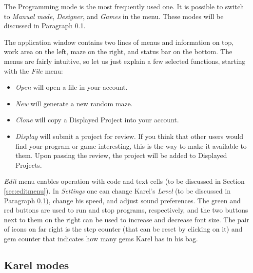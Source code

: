 \noindent
The Programming mode is the most frequently used one. It is possible to 
switch to {\em Manual mode}, {\em Designer}, and {\em Games} in the menu. 
These modes will be discussed in Paragraph \ref{levels}.

The application window contains two lines of menus and information on top,
work area on the left, maze on the right, and status bar on the bottom.
The menus are fairly intuitive, so let us just explain a few selected 
functions, starting with the {\em File} menu:

\begin{itemize}
\item {\em Open} will open a file in your account.
\item {\em New} will generate a new random maze.
\item {\em Clone} will copy a Displayed Project into your account. 
\item {\em Display} will submit a project for review. If you think that 
      other users would find your program or game interesting, this is the way to make it 
      available to them. Upon passing the review, the project will be added to Displayed Projects.
\end{itemize}
{\em Edit} menu enables operation with code and text cells (to be discussed in 
Section \ref{sec:editmenu}). In {\em Settings} one can change Karel's {\em Level} (to be discussed
in Paragraph \ref{levels}), change his speed, and adjust sound preferences. The green and red 
buttons are used to run and stop programs, respectively, and the two buttons next to them on
the right can be used to increase and decrease font size. The pair of icons on far right is the 
step counter (that can be reset by clicking on it) and gem counter that indicates how many gems 
Karel has in his bag.

\subsection{Karel modes} \label{levels}

